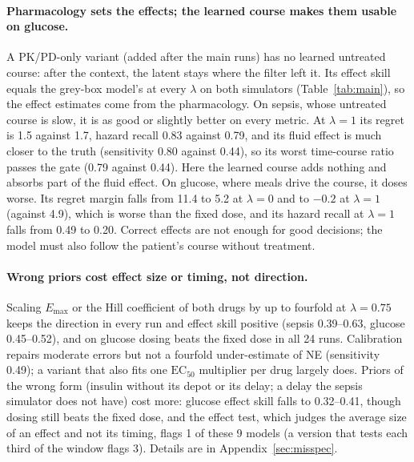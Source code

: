 \documentclass[letterpaper]{article}
\newcommand{\Emax}{E_{\max}}
\begin{document}
\paragraph{Pharmacology sets the effects; the learned course makes them usable on glucose.} A PK/PD-only variant (added after the main runs) has no learned untreated course: after the context, the latent stays where the filter left it. Its effect skill equals the grey-box model's at every $\lambda$ on both simulators (Table~\ref{tab:main}), so the effect estimates come from the pharmacology. On sepsis, whose untreated course is slow, it is as good or slightly better on every metric. At $\lambda=1$ its regret is 1.5 against 1.7, hazard recall 0.83 against 0.79, and its fluid effect is much closer to the truth (sensitivity 0.80 against 0.44), so its worst time-course ratio passes the gate (0.79 against 0.44). Here the learned course adds nothing and absorbs part of the fluid effect. On glucose, where meals drive the course, it doses worse. Its regret margin falls from 11.4 to 5.2 at $\lambda=0$ and to $-0.2$ at $\lambda=1$ (against 4.9), which is worse than the fixed dose, and its hazard recall at $\lambda=1$ falls from 0.49 to 0.20. Correct effects are not enough for good decisions; the model must also follow the patient's course without treatment.

\paragraph{Wrong priors cost effect size or timing, not direction.} Scaling $\Emax$ or the Hill coefficient of both drugs by up to fourfold at $\lambda=0.75$ keeps the direction in every run and effect skill positive (sepsis 0.39--0.63, glucose 0.45--0.52), and on glucose dosing beats the fixed dose in all 24 runs. Calibration repairs moderate errors but not a fourfold under-estimate of NE (sensitivity 0.49); a variant that also fits one $\mathrm{EC}_{50}$ multiplier per drug largely does. Priors of the wrong form (insulin without its depot or its delay; a delay the sepsis simulator does not have) cost more: glucose effect skill falls to 0.32--0.41, though dosing still beats the fixed dose, and the effect test, which judges the average size of an effect and not its timing, flags 1 of these 9 models (a version that tests each third of the window flags 3). Details are in Appendix~\ref{sec:misspec}.
\end{document}
